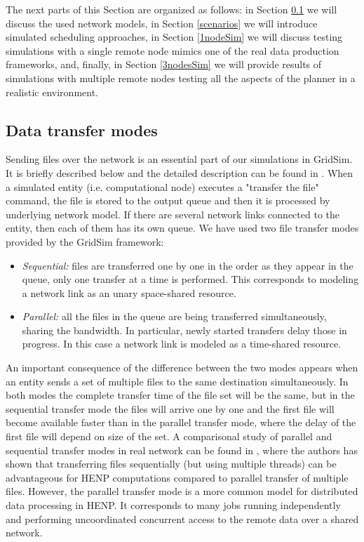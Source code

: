 \documentclass{svjour3}                     %
\begin{document}
The next parts of this Section are organized as follows: in Section \ref{network} we will discuss the used network models, in Section \ref{scenarios} we will introduce simulated scheduling approaches, in Section \ref{1nodeSim} we will discuss testing simulations with a single remote node mimics one of the real data production frameworks, and, finally, in Section \ref{3nodesSim} we will provide results of simulations with multiple remote nodes testing all the aspects of the planner in a realistic environment.


\subsection{Data transfer modes}
\label{network}

Sending files over the network is an essential part of our simulations in GridSim. It is briefly described below and the detailed description can be found in \cite{GridSimNetwork}. When a simulated entity (i.e. computational node) executes a "transfer the file" command, the file is stored to the output queue and then it is processed by underlying network model. If there are several network links connected to the entity, then each of them has its own queue. We have used two file transfer modes provided by the GridSim framework:
\begin{itemize}
\item \textit{Sequential:} files are transferred one by one in the order as they appear in the queue, only one transfer at a time is performed. This corresponds to modeling a network link as an unary space-shared resource.
\item \textit{Parallel:} all the files in the queue are being transferred simultaneously, sharing the bandwidth.  In particular, newly started transfers delay those in progress. In this case a network link is modeled as a time-shared resource.
\end{itemize}
An important consequence of the difference between the two modes appears when an entity sends a set of multiple files to the same destination simultaneously. In both modes the complete transfer time of the file set will be the same, but in the sequential transfer mode the files will arrive one by one and the first file will become available faster than in the parallel transfer mode, where the delay of the first file will depend on size of the set. A comparisonal study of parallel and sequential transfer modes in real network can be found in \cite{Zerola}, where the authors has shown that transferring files sequentially (but using multiple threads) can be advantageous for HENP computations compared to parallel transfer of multiple files. However, the parallel transfer mode is a more common model for distributed data processing in HENP. It corresponds to many jobs running independently and performing uncoordinated concurrent access to the remote data over a shared network.
\end{document}
